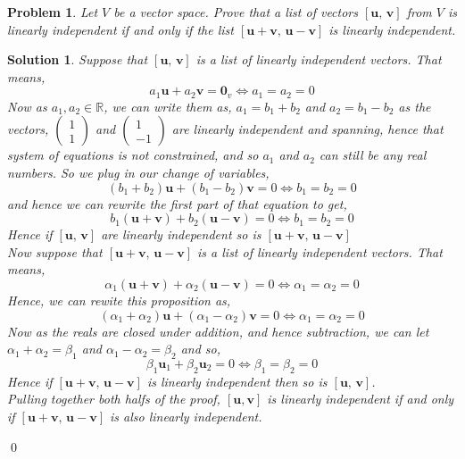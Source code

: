\documentclass{article}
\newcommand{\R}{\mathbb{R}}
\renewcommand{\vec}[1]{\boldsymbol{\mathbf{#1}}}
\renewcommand{\a}{\alpha}
\renewcommand{\b}{\beta}
\newtheorem{problem}{Problem}
\newtheorem{solution}{Solution}
\begin{document}
\newpage
\begin{problem}
  Let $V$ be a vector space. Prove that a list of vectors $[\vec u,\,\vec v]$ from $V$ is linearly independent if and only if the list $[\vec u + \vec v,\, \vec u - \vec v]$ is linearly independent.
\end{problem}
\begin{solution}
  Suppose that $[\vec u,\, \vec v]$ is a list of linearly independent vectors. That means,
  $$ a_1\vec u + a_2\vec v = \vec 0_v \iff a_1 = a_2 = 0 $$
  Now as $a_1, a_2 \in \R$, we can write them as, $a_1 = b_1 + b_2$ and $a_2 = b_1 - b_2$ as the vectors, $\displaystyle{\begin{pmatrix} 1 \\ 1\end{pmatrix}}$ and $\displaystyle{\begin{pmatrix} 1 \\ -1\end{pmatrix}}$ are linearly independent and spanning, hence that system of equations is not constrained, and so $a_1$ and $a_2$ can still be any real numbers. So we plug in our change of variables,
  $$ (b_1 + b_2)\vec u + (b_1 - b_2)\vec v = 0 \iff b_1 = b_2 = 0 $$
  and hence we can rewrite the first part of that equation to get,
  $$ b_1(\vec u + \vec v) + b_2(\vec u - \vec v) = 0 \iff b_1 = b_2 = 0 $$
  Hence if $[\vec u,\, \vec v]$ are linearly independent so is $[\vec u + \vec v,\, \vec u - \vec v]$\\

  \noindent
  Now suppose that $[\vec u + \vec v,\, \vec u - \vec v]$ is a list of linearly independent vectors. That means,
  $$ \a_1(\vec u + \vec v) + \a_2(\vec u - \vec v) = 0 \iff \a_1 = \a_2 = 0 $$
  Hence, we can rewite this proposition as,
  $$ (\a_1 + \a_2)\vec u + (\a_1 - \a_2)\vec v = 0 \iff \a_1 = \a_2 = 0 $$
  Now as the reals are closed under addition, and hence subtraction, we can let $\a_1 + \a_2 = \b_1$ and $\a_1 - \a_2 = \b_2$ and so,
  $$ \b_1\vec u_1 + \b_2\vec u_2 = 0 \iff \b_1 = \b_2 = 0 $$
  Hence if $[\vec u + \vec v, \,\vec u - \vec v]$ is linearly independent then so is $[\vec u,\, \vec v]$.\\

  \noindent
  Pulling together both halfs of the proof, $[\vec u, \vec v]$ is linearly independent if and only if $[\vec u + \vec v,\, \vec u - \vec v]$ is also linearly independent.
\end{solution}\qed
\end{document}
